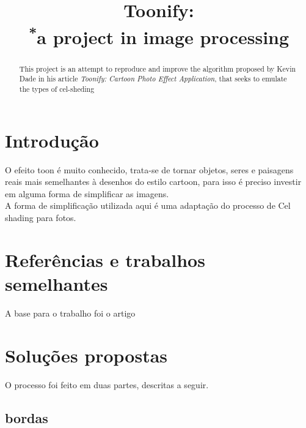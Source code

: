 \documentclass[10pt,technote]{IEEEtran}
\begin{document}
\title{Toonify:\\
{\footnotesize \textsuperscript{*}a project in image processing}
}
\author{
\and
{}
}

\maketitle
\begin{abstract}
This project is an attempt to reproduce and improve the algorithm proposed by Kevin Dade in his article\cite{CITE-artigobase}
\textit{Toonify: Cartoon Photo Effect Application}, that seeks to emulate the types of cel-sheding
\end{abstract}

\section{Introdução}
	O efeito toon é muito conhecido, trata-se de tornar objetos, seres e paisagens reais mais semelhantes à desenhos do estilo cartoon, para isso é preciso investir em alguma forma de simplificar as imagens.\\
	A forma de simplificação utilizada aqui é uma adaptação  do processo de Cel shading\cite{CITE-celshading} para fotos.  
\section{Referências e trabalhos semelhantes}
	A base para o trabalho foi o artigo \cite{CITE-artigobase}
\section{Soluções propostas}
	O processo foi feito em duas partes, descritas a seguir.
	\subsection{bordas}
\end{document}
